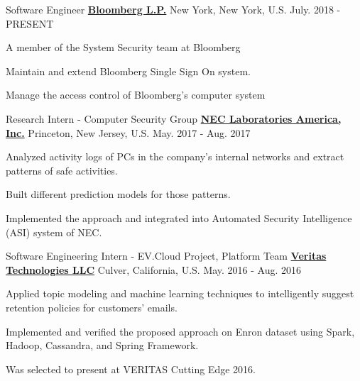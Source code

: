 

\begin{cventries}
\cventry
{Software Engineer} %
{\href{http://www.bloomberg.com/}{\bf Bloomberg L.P.}}  %
{New York, New York, U.S.} %
{July. 2018 - PRESENT} %
{
		\begin{cvitems} %
			\item A member of the System Security team at Bloomberg
			\item Maintain and extend Bloomberg Single Sign On system.
			\item Manage the access control of Bloomberg's computer system
		\end{cvitems}
}


\cventry
{Research Intern - Computer Security Group} %
{\href{http://www.nec-labs.com/}{\bf NEC Laboratories America, Inc.}}  %
{Princeton, New Jersey, U.S.} %
{May. 2017 - Aug. 2017} %
{
	\begin{cvitems} %
		\item Analyzed activity logs of PCs in the company's internal networks and extract patterns of safe activities.
		\item Built different prediction models for those patterns.
		\item Implemented the approach and integrated into Automated Security Intelligence (ASI) system of NEC.
	\end{cvitems}
}
	
	
\cventry
{Software Engineering Intern - EV.Cloud Project, Platform Team} %
{\href{https://www.veritas.com/}{\bf Veritas Technologies LLC}}  %
{Culver, California, U.S.} %
{May. 2016 - Aug. 2016} %
{
	\begin{cvitems} %
		\item Applied topic modeling and machine learning techniques to intelligently suggest retention policies for customers' emails.
		\item Implemented and verified the proposed approach on Enron dataset using Spark, Hadoop, Cassandra, and Spring Framework.
		\item Was selected to present at VERITAS Cutting Edge 2016.
	\end{cvitems}
}


\end{cventries}
